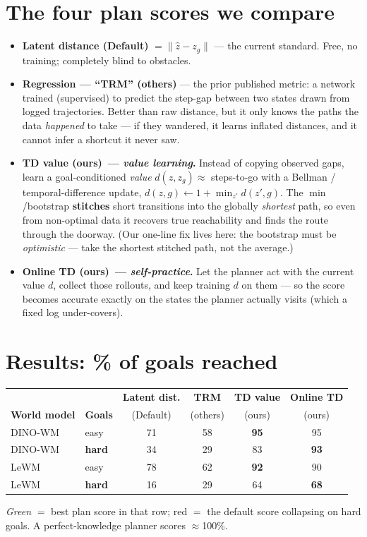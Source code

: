 \documentclass[11pt]{article}
\newcommand{\g}[1]{\textcolor{good}{\textbf{#1}}}
\newcommand{\rd}[1]{\textcolor{bad}{#1}}
\newcommand{\dft}{{\small(Default)}}
\newcommand{\oth}{{\small(others)}}
\newcommand{\ours}{{\small(ours)}}
\begin{document}
\section{The four plan scores we compare}
\begin{itemize}[leftmargin=1.4em,itemsep=0.7ex,topsep=0.4ex]
\item \textbf{Latent distance \dft} $=\lVert \hat z-z_g\rVert$ --- the current standard. Free, no training;
completely blind to obstacles.
\item \textbf{Regression --- ``TRM'' \oth} --- the prior published metric: a network trained (supervised) to
predict the step-gap between two states drawn from logged trajectories. Better than raw distance, but it only
knows the paths the data \emph{happened} to take --- if they wandered, it learns inflated distances, and it
cannot infer a shortcut it never saw.
\item \textbf{TD value \ours\ --- \emph{value learning}.} Instead of copying observed gaps, learn a
goal-conditioned \emph{value} $d(z,z_g)\!\approx\!$ steps-to-go with a Bellman / temporal-difference update,
$d(z,g)\leftarrow 1+\min_{z'} d(z',g)$. The $\min$/bootstrap \textbf{stitches} short transitions
into the globally \emph{shortest} path, so even from non-optimal data it recovers true reachability and finds
the route through the doorway. (Our one-line fix lives here: the bootstrap must be \emph{optimistic} --- take
the shortest stitched path, not the average.)
\item \textbf{Online TD \ours\ --- \emph{self-practice}.} Let the planner act with the current value $d$,
collect those rollouts, and keep training $d$ on them --- so the score becomes accurate exactly on the states
the planner actually visits (which a fixed log under-covers).
\end{itemize}

\section{Results: \% of goals reached}
\begin{center}
\renewcommand{\arraystretch}{1.4}
\setlength{\tabcolsep}{5pt}
\begin{tabular}{ll cccc}
\toprule
 & & \textbf{Latent dist.} & \textbf{TRM} & \textbf{TD value} & \textbf{Online TD} \\
\textbf{World model} & \textbf{Goals} & \dft & \oth & \ours & \ours \\
\midrule
\textsf{DINO-WM} & easy & 71 & 58 & \g{95} & 95 \\
\textsf{DINO-WM} & \textbf{hard} & \rd{34} & 29 & 83 & \g{93} \\
\addlinespace[3pt]
\textsf{LeWM}    & easy & 78 & 62 & \g{92} & 90 \\
\textsf{LeWM}    & \textbf{hard} & \rd{16} & 29 & 64 & \g{68} \\
\bottomrule
\end{tabular}
\end{center}
{\small \emph{Green} $=$ best plan score in that row;\; \textcolor{bad}{red} $=$ the default score collapsing
on hard goals.\; A perfect-knowledge planner scores $\approx$100\%.}
\end{document}
